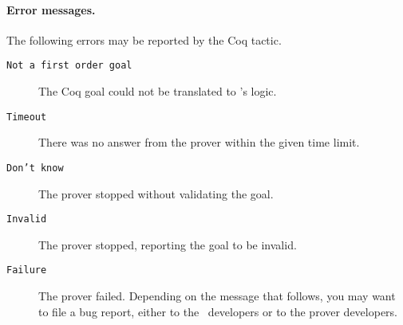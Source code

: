 \paragraph{Error messages.} The following errors may be reported by
the Coq tactic.
\begin{description}
\item[\texttt{Not a first order goal}]\emptyitem
  The Coq goal could not be translated to \why's logic.
\item[\texttt{Timeout}]\emptyitem
  There was no answer from the prover within the given time limit.
\item[\texttt{Don't know}]\emptyitem
  The prover stopped without validating the goal.
\item[\texttt{Invalid}]\emptyitem
  The prover stopped, reporting the goal to be invalid.
\item[\texttt{Failure}]\emptyitem
  The prover failed. Depending on the message that follows, you may
  want to file a bug report, either to the \why\ developers or to the
  prover developers.
\end{description}

